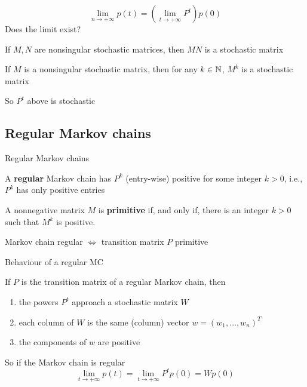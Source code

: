 \documentclass[aspectratio=169]{beamer}\usepackage[]{graphicx}\usepackage[]{xcolor}
\begin{document}
\begin{frame}
\[
\lim_{n\rightarrow +\infty}p(t) = 
\left(\lim_{t\rightarrow +\infty}P^t\right)p(0)
\]
Does the limit exist?
\vfill
\begin{theorem}
If $M,N$ are nonsingular stochastic matrices, then $MN$ is a stochastic matrix
\end{theorem}
\vfill
\begin{corollary}
If $M$ is a nonsingular stochastic matrix, then for any $k\in\mathbb{N}$, $M^k$ is a stochastic matrix
\end{corollary}
\vfill
So $P^t$ above is stochastic
\end{frame}

\subsection{Regular Markov chains}


\begin{frame}{Regular Markov chains}
\begin{definition}
A \textbf{regular} Markov chain has $P^k$ (entry-wise) positive for some integer $k>0$, i.e., $P^k$ has only positive entries
\end{definition}
\vfill
\begin{definition}
A nonnegative matrix $M$ is \textbf{primitive} if, and only if, there is an integer $k>0$ such that $M^k$ is positive.
\end{definition}
\vfill
\begin{theorem}
Markov chain regular $\iff$ transition matrix $P$ primitive
\end{theorem}
\end{frame}

\begin{frame}{Behaviour of a regular MC}
\begin{theorem}
If $P$ is the transition matrix of a regular Markov chain, then
\begin{enumerate}
\item the powers $P^t$ approach a stochastic matrix $W$
\item each column of $W$ is the same (column) vector $w=(w_1,\ldots,w_n)^T$
\item the components of $w$ are positive
\end{enumerate}
\end{theorem}
\vfill
So if the Markov chain is regular
\[
\lim_{t\rightarrow +\infty}p(t)=\lim_{t\rightarrow +\infty}P^tp(0)
=Wp(0)
\]
\end{frame}
\end{document}
